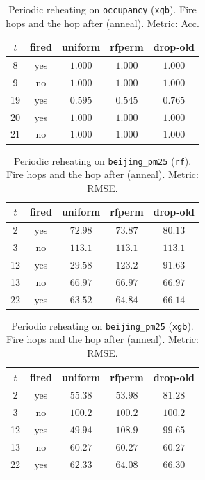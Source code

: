 \begin{table}[ht]\centering
\caption{Periodic reheating on \texttt{occupancy} (\texttt{xgb}).
Fire hops and the hop after (anneal). Metric: Acc.}
\label{tab:po-refit-periodic-occupancy-xgb}
\small
\begin{tabular}{@{}ccccc@{}}\toprule
$t$ & fired & uniform & rfperm & drop-old \\
\midrule
8 & yes & $1.000$ & $1.000$ & $1.000$ \\
9 & no & $1.000$ & $1.000$ & $1.000$ \\
19 & yes & $0.595$ & $0.545$ & $0.765$ \\
20 & yes & $1.000$ & $1.000$ & $1.000$ \\
21 & no & $1.000$ & $1.000$ & $1.000$ \\
\bottomrule
\end{tabular}
\end{table}

\begin{table}[ht]\centering
\caption{Periodic reheating on \texttt{beijing\_pm25} (\texttt{rf}).
Fire hops and the hop after (anneal). Metric: RMSE.}
\label{tab:po-refit-periodic-beijing-pm25-rf}
\small
\begin{tabular}{@{}ccccc@{}}\toprule
$t$ & fired & uniform & rfperm & drop-old \\
\midrule
2 & yes & $72.98$ & $73.87$ & $80.13$ \\
3 & no & $113.1$ & $113.1$ & $113.1$ \\
12 & yes & $29.58$ & $123.2$ & $91.63$ \\
13 & no & $66.97$ & $66.97$ & $66.97$ \\
22 & yes & $63.52$ & $64.84$ & $66.14$ \\
\bottomrule
\end{tabular}
\end{table}

\begin{table}[ht]\centering
\caption{Periodic reheating on \texttt{beijing\_pm25} (\texttt{xgb}).
Fire hops and the hop after (anneal). Metric: RMSE.}
\label{tab:po-refit-periodic-beijing-pm25-xgb}
\small
\begin{tabular}{@{}ccccc@{}}\toprule
$t$ & fired & uniform & rfperm & drop-old \\
\midrule
2 & yes & $55.38$ & $53.98$ & $81.28$ \\
3 & no & $100.2$ & $100.2$ & $100.2$ \\
12 & yes & $49.94$ & $108.9$ & $99.65$ \\
13 & no & $60.27$ & $60.27$ & $60.27$ \\
22 & yes & $62.33$ & $64.08$ & $66.30$ \\
\bottomrule
\end{tabular}
\end{table}
